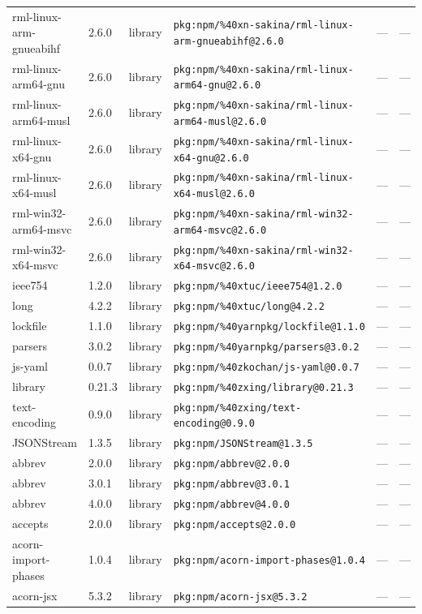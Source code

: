 \documentclass[11pt]{article}
\begin{document}
\begin{longtable}{|l|l|l|p{2.2cm}|l|p{4cm}|}
rml-linux-arm-gnueabihf & 2.6.0 & library & \texttt{pkg:npm/\%40xn-sakina/rml-linux-arm-gnueabihf@2.6.0} & — & — \\
rml-linux-arm64-gnu & 2.6.0 & library & \texttt{pkg:npm/\%40xn-sakina/rml-linux-arm64-gnu@2.6.0} & — & — \\
rml-linux-arm64-musl & 2.6.0 & library & \texttt{pkg:npm/\%40xn-sakina/rml-linux-arm64-musl@2.6.0} & — & — \\
rml-linux-x64-gnu & 2.6.0 & library & \texttt{pkg:npm/\%40xn-sakina/rml-linux-x64-gnu@2.6.0} & — & — \\
rml-linux-x64-musl & 2.6.0 & library & \texttt{pkg:npm/\%40xn-sakina/rml-linux-x64-musl@2.6.0} & — & — \\
rml-win32-arm64-msvc & 2.6.0 & library & \texttt{pkg:npm/\%40xn-sakina/rml-win32-arm64-msvc@2.6.0} & — & — \\
rml-win32-x64-msvc & 2.6.0 & library & \texttt{pkg:npm/\%40xn-sakina/rml-win32-x64-msvc@2.6.0} & — & — \\
ieee754 & 1.2.0 & library & \texttt{pkg:npm/\%40xtuc/ieee754@1.2.0} & — & — \\
long & 4.2.2 & library & \texttt{pkg:npm/\%40xtuc/long@4.2.2} & — & — \\
lockfile & 1.1.0 & library & \texttt{pkg:npm/\%40yarnpkg/lockfile@1.1.0} & — & — \\
parsers & 3.0.2 & library & \texttt{pkg:npm/\%40yarnpkg/parsers@3.0.2} & — & — \\
js-yaml & 0.0.7 & library & \texttt{pkg:npm/\%40zkochan/js-yaml@0.0.7} & — & — \\
library & 0.21.3 & library & \texttt{pkg:npm/\%40zxing/library@0.21.3} & — & — \\
text-encoding & 0.9.0 & library & \texttt{pkg:npm/\%40zxing/text-encoding@0.9.0} & — & — \\
JSONStream & 1.3.5 & library & \texttt{pkg:npm/JSONStream@1.3.5} & — & — \\
abbrev & 2.0.0 & library & \texttt{pkg:npm/abbrev@2.0.0} & — & — \\
abbrev & 3.0.1 & library & \texttt{pkg:npm/abbrev@3.0.1} & — & — \\
abbrev & 4.0.0 & library & \texttt{pkg:npm/abbrev@4.0.0} & — & — \\
accepts & 2.0.0 & library & \texttt{pkg:npm/accepts@2.0.0} & — & — \\
acorn-import-phases & 1.0.4 & library & \texttt{pkg:npm/acorn-import-phases@1.0.4} & — & — \\
acorn-jsx & 5.3.2 & library & \texttt{pkg:npm/acorn-jsx@5.3.2} & — & — \\

\end{longtable}
\end{document}
